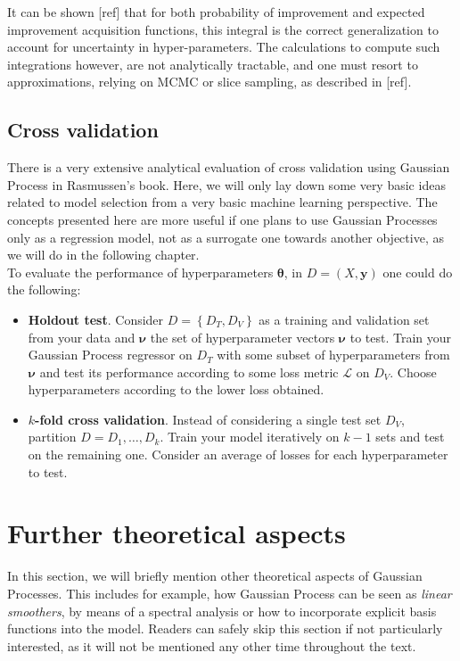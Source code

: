 \documentclass[10pt,a4paper,twoside]{book}
\begin{document}
It can be shown [ref] that for both probability of improvement and expected improvement acquisition functions, this integral is the correct generalization to account for uncertainty in hyper-parameters. The calculations to compute such integrations however, are not analytically tractable, and one must resort to approximations, relying on MCMC or slice sampling, as described in [ref].

\subsection{Cross validation}

There is a very extensive analytical evaluation of cross validation using Gaussian Process in Rasmussen's book. Here, we will only lay down some very basic ideas related to model selection from a very basic machine learning perspective. The concepts presented here are more useful if one plans to use Gaussian Processes only as a regression model, not as a surrogate one towards another objective, as we will do in the following chapter. \\

To evaluate the performance of hyperparameters $\boldsymbol{\theta}$, in $D=\left( X, \boldsymbol{y}\right)$ one could do the following:

\begin{itemize}
\item \textbf{Holdout test}. Consider $D = \left\lbrace D_T, D_V \right\rbrace$ as a training and validation set from your data and $\boldsymbol{\nu}$ the set of hyperparameter vectors $\boldsymbol{\nu}$ to test. Train your Gaussian Process regressor on $D_T$ with some subset of hyperparameters from $\boldsymbol{\nu}$ and test its performance according to some loss metric $\mathcal{L}$ on $D_V$. Choose hyperparameters according to the lower loss obtained.
\item \textbf{$k$-fold cross validation}. Instead of considering a single test set $D_V$, partition $D={D_1,\dots, D_k}$. Train your model iteratively on $k-1$ sets and test on the remaining one. Consider an average of losses for each hyperparameter to test.  
\end{itemize}

\section{Further theoretical aspects}

In this section, we will briefly mention other theoretical aspects of Gaussian Processes. This includes for example, how Gaussian Process can be seen as \textit{linear smoothers}, by means of a spectral analysis or how to incorporate explicit basis functions into the model. Readers can safely skip this section if not particularly interested, as it will not be mentioned any other time throughout the text.
\end{document}

